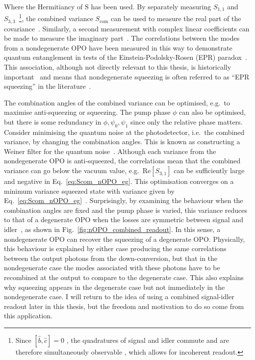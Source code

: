 Where the Hermitiancy of $\text{S}$ has been used.
By separately measuring $S_{1,1}$ and $S_{3,3}$~\footnote{Since $[\hat b, \hat c]=0$ , the quadratures of signal and idler commute and are therefore simultaneously observable , which allows for incoherent readout.}, the combined variance $S_\text{com}$ can be used to measure the real part of the covariance~\cite{}. Similarly, a second measurement with complex linear coefficients can be made to measure the imaginary part~\cite{}. The correlations between the modes from a nondegenerate OPO have been measured in this way to demonstrate quantum entanglement in tests of the Einstein-Podolsky-Rosen (EPR) paradox~\cite{Reid1985,Schori2001,EPR19..}. This association, although not directly relevant to this thesis, is historically important~\cite{} and means that nondegenerate squeezing is often referred to as ``EPR squeezing'' in the literature~\cite{}. %

The combination angles of the combined variance can be optimised, e.g.\ to maximise anti-squeezing or squeezing. The pump phase $\phi$ can also be optimised, but there is some redundancy in $\phi, \psi_0, \psi_1$ since only the relative phase matters. Consider minimising the quantum noise at the photodetector, i.e.\ the combined variance, by changing the combination angles. This is known as constructing a Weiner filter for the quantum noise~\cite{}. Although each variance from the nondegenerate OPO is anti-squeezed, the correlations mean that the combined variance can go below the vacuum value, e.g.\ $\text{Re}[S_{3,1}]$ can be sufficiently large and negative in Eq.~\ref{eq:Scom_nOPO_eg}. This optimisation  converges on a minimum variance squeezed state with variance given by Eq.~\ref{eq:Scom_nOPO_eg}~\cite{}. Surprisingly, by examining the behaviour when the combination angles are fixed and the pump phase is varied, this variance reduces to that of a degenerate OPO when the losses are symmetric between signal and idler~\cite{}, as shown in Fig.~\ref{fig:nOPO_combined_readout}. In this sense, a nondegenerate OPO can recover the squeezing of a degenerate OPO. Physically, this behaviour is explained by either case producing the same correlations between the output photons from the down-conversion, but that in the nondegenerate case the modes associated with these photons have to be recombined at the output to compare to the degenerate case. This also explains why squeezing appears in the degenerate case but not immediately in the nondegenerate case. %
I will return to the idea of using a combined signal-idler readout later in this thesis, but the freedom and motivation to do so come from this application. %



